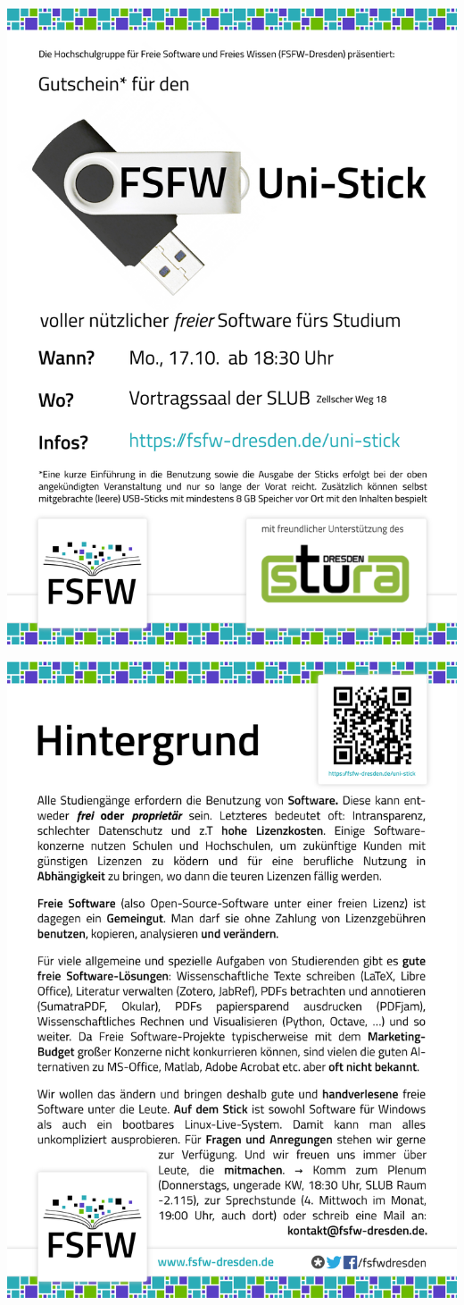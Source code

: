 \documentclass[a4paper]{report}
\begin{document}
\pagestyle{empty}
\includegraphics[width=\linewidth]{gutschein-seite-1}

\includegraphics[width=\linewidth]{gutschein-seite-2}
\end{document}
